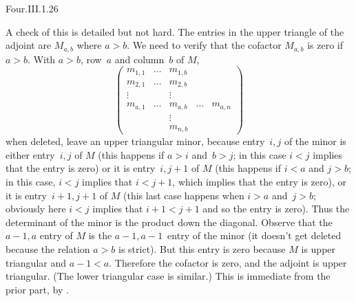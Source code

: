 \begin{ans}{Four.III.1.26}
\begin{exparts}
          A check of this is detailed but not hard.
          The entries in the upper triangle of the adjoint are
          $M_{a,b}$ where $a>b$.
          We need to verify that the cofactor $M_{a,b}$ is zero if  $a>b$.
          With $a>b$, row~$a$ and column~$b$ of $M$,
          \begin{equation*}
            \begin{pmatrix}
              m_{1,1} &\ldots   &m_{1,b}  &       &        \\
              m_{2,1} &\ldots   &m_{2,b}  &       &        \\
              \vdots  &         &\vdots   &       &        \\
              m_{a,1} &\ldots   &m_{a,b}  &\ldots &m_{a,n} \\
                      &         &\vdots   &       &        \\
                      &         &m_{n,b}  &       &
            \end{pmatrix}
          \end{equation*}
          when deleted, leave an upper triangular minor,
          because entry~$i,j$ of the minor is either entry~$i,j$ of
          $M$ (this happens if $a>i$ and~$b>j$;
          in this case $i<j$ implies that the entry is zero)
          or it is entry~$i,j+1$ of $M$ (this happens if $i<a$ and
          $j>b$; in this case, $i<j$ implies that $i<j+1$, which implies
          that the entry is zero), or it is entry~$i+1,j+1$ of $M$
          (this last case happens when $i>a$ and~$j>b$; obviously here
          $i<j$ implies that $i+1<j+1$ and so the entry is zero).
          Thus the determinant of the minor is the product down the
          diagonal.
          Observe that the $a-1,a$ entry of $M$ is the
          $a-1,a-1$~entry of the minor (it doesn't get
          deleted because the relation $a>b$ is strict).
          But this entry is zero because $M$ is upper triangular and
          $a-1<a$.
          Therefore the cofactor is zero, and the adjoint is upper triangular.
          (The lower triangular case is similar.)
        \partsitem This is immediate from the prior part, by
          .
      \end{exparts}
    
\end{ans}
